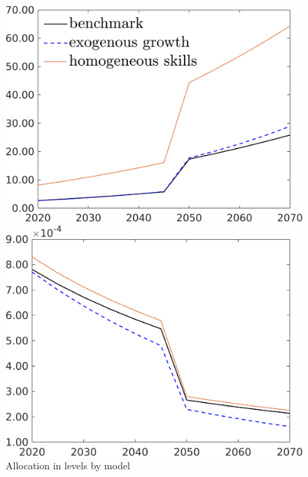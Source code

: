 \begin{figure}[h!!]
	\centering
	\caption{Allocation in levels by model}\label{fig:comp_mod_allo_lev}
	\begin{minipage}[]{0.32\textwidth}
		\includegraphics[width=1\textwidth]{../../codding_model/own_basedOnFried/optimalPol_190722_tidiedUp/figures/all_10Aout22/CompMod1_OPT_T_NoTaus_GFF_regime3_spillover0_noskill0_sep1_xgrowth0_extern0_PV1_etaa0.79_lgd1.png}
	\end{minipage}
	\begin{minipage}[]{0.32\textwidth}
		\includegraphics[width=1\textwidth]{../../codding_model/own_basedOnFried/optimalPol_190722_tidiedUp/figures/all_10Aout22/CompMod1_OPT_T_NoTaus_Lf_regime3_spillover0_noskill0_sep1_xgrowth0_extern0_PV1_etaa0.79_lgd0.png}

\end{minipage}
\end{figure}

